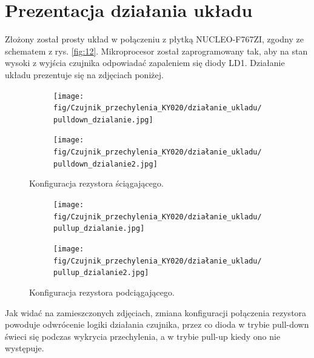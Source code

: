 \documentclass[11pt, a4paper]{article}
\begin{document}
\newpage

\section{Prezentacja działania układu}
Złożony został prosty układ w połączeniu z płytką NUCLEO-F767ZI, zgodny ze schematem z rys. \ref{fig:12}. Mikroprocesor został zaprogramowany tak, aby na stan wysoki z wyjścia czujnika odpowiadać zapaleniem się diody LD1. Działanie układu prezentuje się na zdjęciach poniżej. 

\begin{figure}[h]
\centering
\begin{subfigure}{.4\textwidth}
  \centering
  \texttt{[image: fig/Czujnik\_przechylenia\_KY020/działanie\_ukladu/pulldown\_dzialanie.jpg]}
  \label{fig:12pd}
\end{subfigure}
\begin{subfigure}{.4\textwidth}
  \centering
  \texttt{[image: fig/Czujnik\_przechylenia\_KY020/działanie\_ukladu/pulldown\_dzialanie2.jpg]}
  \label{fig:sub2}
\end{subfigure}
\caption{Konfiguracja rezystora ściągającego.}
\label{fig:12pu}
\end{figure}

\begin{figure}[h]
\centering
\begin{subfigure}{.4\textwidth}
  \centering
  \texttt{[image: fig/Czujnik\_przechylenia\_KY020/działanie\_ukladu/pullup\_dzialanie.jpg]}
  \label{fig:12pd}
\end{subfigure}
\begin{subfigure}{.4\textwidth}
  \centering
  \texttt{[image: fig/Czujnik\_przechylenia\_KY020/działanie\_ukladu/pullup\_dzialanie2.jpg]}
  \label{fig:sub2}
\end{subfigure}
\caption{Konfiguracja rezystora podciągającego.}
\label{fig:12pu}
\end{figure}

Jak widać na zamieszczonych zdjęciach, zmiana konfiguracji połączenia rezystora powoduje odwrócenie logiki działania czujnika, przez co dioda w trybie pull-down świeci się podczas wykrycia przechylenia, a w trybie pull-up kiedy ono nie występuje. 
\end{document}
